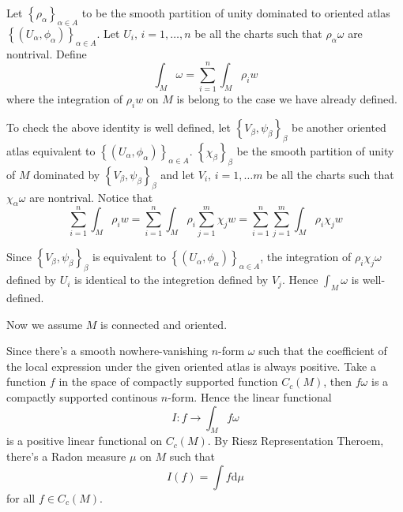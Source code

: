 \documentclass[12pt,a4paper]{book}
\newcommand{\bbrace}[1]{\left\{ #1 \right\} }
\newcommand{\dd}{\text{d}}
\theoremstyle{definition}
\newtheorem{prop}[defn]{Proposition}
\begin{document}
Let $\bbrace{\rho_{\alpha}}_{\alpha\in A}$ to be the smooth
partition of unity dominated to oriented atlas $\bbrace{(U_{\alpha},\phi_{\alpha})}_{\alpha\in A}$.
Let $U_i,\, i=1,\dots,n$ be all the charts such that $\rho_{\alpha}\omega$ are nontrival.
Define
\begin{equation*}
    \int_{M}\omega=\sum_{i=1}^n\int_M\rho_i w
\end{equation*}
where the integration of $\rho_i w$ on $M$ is belong to the case we have already defined.

To check the above identity is well defined, let $\bbrace{V_{\beta},\psi_{\beta}}_{\beta}$ be another oriented atlas equivalent to $\bbrace{(U_{\alpha},\phi_{\alpha})}_{\alpha\in A}$.
$\bbrace{\chi_{\beta}}_{\beta}$ be the smooth partition of unity of $M$ dominated by $\bbrace{V_{\beta},\psi_{\beta}}_{\beta}$
and let $V_i,\, i=1,\dots m$ be all the charts such that $\chi_{\alpha}\omega$ are nontrival.
Notice that
\begin{equation*}
    \sum_{i=1}^n\int_M\rho_i w=\sum_{i=1}^n\int_M\rho_i\sum_{j=1}^m \chi_j w=\sum_{i=1}^n \sum_{j=1}^m \int_M \rho_i \chi_j w
\end{equation*}

Since $\bbrace{V_{\beta},\psi_{\beta}}_{\beta}$ is equivalent to $\bbrace{(U_{\alpha},\phi_{\alpha})}_{\alpha\in A}$,
the integration of $\rho_i \chi_j \omega$ defined by $U_i$ is identical to the integretion defined by $V_j$.
Hence $\int_M \omega $ is well-defined.

Now we assume $M$ is connected and oriented.

Since there's a smooth nowhere-vanishing $n$-form $\omega$ such that the coefficient of the local expression under the given oriented atlas is always positive.
Take a function $f$ in the space of compactly supported function $C_c(M)$, then $f\omega$ is a compactly supported continous $n$-form. Hence the linear functional
\begin{equation*}
    I:f\rightarrow \int_M f\omega
\end{equation*}
is a positive linear functional on $C_c(M)$. By Riesz Representation Theroem, there's a Radon measure $\mu$ on $M$ such that
\begin{equation*}
    I(f)=\int f \dd \mu
\end{equation*}
for all $f\in C_c(M)$.
\end{document}
